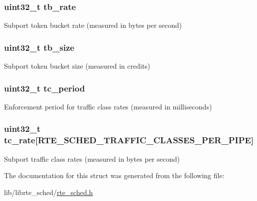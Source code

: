 \subsubsection[{tb\+\_\+rate}]{\setlength{\rightskip}{0pt plus 5cm}uint32\+\_\+t tb\+\_\+rate}\label{structrte__sched__subport__params_aa64063ce773f9f838ade073d6165dfe5}
Subport token bucket rate (measured in bytes per second) \hypertarget{structrte__sched__subport__params_a195cebdb412ff2ca5b671188f11efec3}{}
\subsubsection[{tb\+\_\+size}]{\setlength{\rightskip}{0pt plus 5cm}uint32\+\_\+t tb\+\_\+size}\label{structrte__sched__subport__params_a195cebdb412ff2ca5b671188f11efec3}
Subport token bucket size (measured in credits) \hypertarget{structrte__sched__subport__params_a9c10b3eb86bcd8d9db80b934a4340e5d}{}
\subsubsection[{tc\+\_\+period}]{\setlength{\rightskip}{0pt plus 5cm}uint32\+\_\+t tc\+\_\+period}\label{structrte__sched__subport__params_a9c10b3eb86bcd8d9db80b934a4340e5d}
Enforcement period for traffic class rates (measured in milliseconds) \hypertarget{structrte__sched__subport__params_a2cf879b3b3815b594057ba4dfcbb13bb}{}
\subsubsection[{tc\+\_\+rate}]{\setlength{\rightskip}{0pt plus 5cm}uint32\+\_\+t tc\+\_\+rate\mbox{[}{\bf R\+T\+E\+\_\+\+S\+C\+H\+E\+D\+\_\+\+T\+R\+A\+F\+F\+I\+C\+\_\+\+C\+L\+A\+S\+S\+E\+S\+\_\+\+P\+E\+R\+\_\+\+P\+I\+P\+E}\mbox{]}}\label{structrte__sched__subport__params_a2cf879b3b3815b594057ba4dfcbb13bb}
Subport traffic class rates (measured in bytes per second) 

The documentation for this struct was generated from the following file\+:\begin{DoxyCompactItemize}
\item 
lib/librte\+\_\+sched/\hyperlink{rte__sched_8h}{rte\+\_\+sched.\+h}\end{DoxyCompactItemize}
